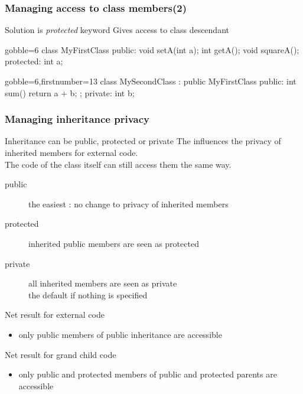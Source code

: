 \begin{frame}[fragile]
  \frametitle{Managing access to class members(2)}
  \begin{block}{Solution is {\it protected} keyword}
    Gives access to class descendant
  \end{block}
  \begin{multicols}{2}
    \begin{cppcode*}{gobble=6}
      class MyFirstClass {
      public:
        void setA(int a);
        int getA();
        void squareA();
      protected:
        int a;
      }
    \end{cppcode*}
    \columnbreak
    \begin{cppcode*}{gobble=6,firstnumber=13}
      class MySecondClass :
        public MyFirstClass {
      public:
        int sum() {
          return a + b;
        };
      private:
        int b;
      }
    \end{cppcode*}
  \end{multicols}
\end{frame}

\begin{frame}[fragile,label=current]
  \frametitle{Managing inheritance privacy}
  \begin{block}{Inheritance can be public, protected or private}
    The influences the privacy of inherited members for external code.\\
    The code of the class itself can still access them the same way.
    \begin{description}
    \item[public] the easiest : no change to privacy of inherited members
    \item[protected] inherited public members are seen as protected
    \item[private] all inherited members are seen as private \\
      the default if nothing is specified
    \end{description}
  \end{block}
  \pause
  \begin{block}{Net result for external code}
    \begin{itemize}
    \item only public members of public inheritance are accessible
    \end{itemize}
  \end{block}
  \begin{block}{Net result for grand child code}
    \begin{itemize}
    \item only public and protected members of public and protected parents are accessible
    \end{itemize}
  \end{block}
\end{frame}

